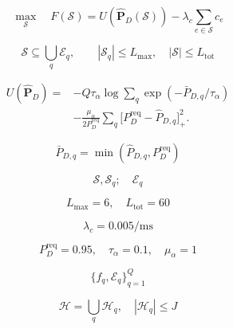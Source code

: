 \documentclass[12pt]{article}
\begin{document}
\begin{equation*}\displaystyle \max_{\mathcal S}\quad F(\mathcal S)=U\!\left(\widehat{\mathbf P}_D(\mathcal S)\right)-\lambda_c\sum_{e\in\mathcal S}c_e\end{equation*}

\begin{equation*}\displaystyle \mathcal S\subseteq\bigcup_q\mathcal E_q,\qquad |\mathcal S_q|\le L_{\max},\quad |\mathcal S|\le L_{\mathrm{tot}}\end{equation*}

\begin{equation*}\displaystyle \begin{aligned}U(\widehat{\mathbf P}_D)=&-Q\tau_\alpha\log\sum\nolimits_q\exp\!\left(-\bar P_{D,q}/\tau_\alpha\right)\\[4pt]&-\tfrac{\mu_\alpha}{2P_D^{\mathrm{req}}}\sum\nolimits_q\bigl[P_D^{\mathrm{req}}-\widehat P_{D,q}\bigr]_+^2.\end{aligned}\end{equation*}

\begin{equation*}\displaystyle \bar P_{D,q}=\min\!\left(\widehat P_{D,q},P_D^{\mathrm{req}}\right)\end{equation*}

\begin{equation*}\displaystyle \mathcal S,\mathcal S_q;\quad\mathcal E_q\end{equation*}

\begin{equation*}\displaystyle L_{\max}=6,\quad L_{\mathrm{tot}}=60\end{equation*}

\begin{equation*}\displaystyle \lambda_c=0.005/\mathrm{ms}\end{equation*}

\begin{equation*}\displaystyle P_D^{\mathrm{req}}=0.95,\quad\tau_\alpha=0.1,\quad\mu_\alpha=1\end{equation*}

\begin{equation*}\displaystyle \{f_q,\mathcal E_q\}_{q=1}^Q\end{equation*}

\begin{equation*}\displaystyle \mathcal H=\bigcup_q\mathcal H_q,\quad |\mathcal H_q|\le J\end{equation*}
\end{document}
